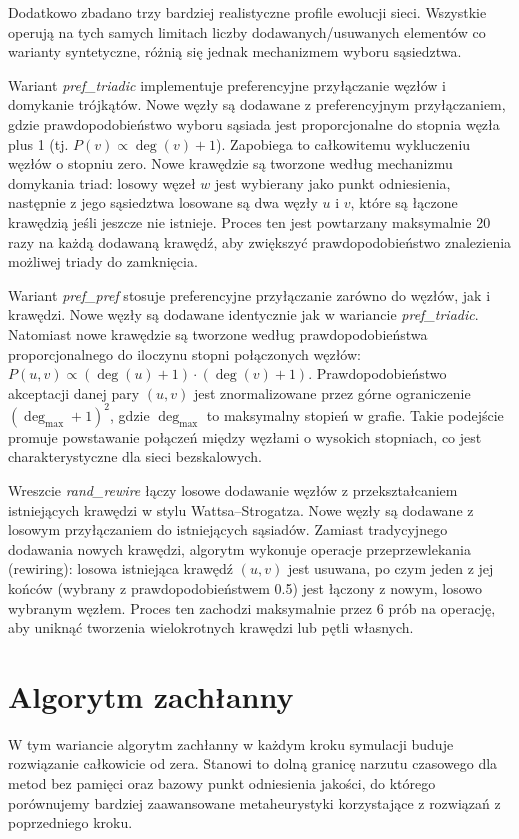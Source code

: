 Dodatkowo zbadano trzy bardziej realistyczne profile ewolucji sieci. Wszystkie operują na tych samych limitach liczby dodawanych/usuwanych elementów co warianty syntetyczne, różnią się jednak mechanizmem wyboru sąsiedztwa.

Wariant \emph{pref\_triadic} implementuje preferencyjne przyłączanie węzłów i domykanie trójkątów. Nowe węzły są dodawane z preferencyjnym przyłączaniem, gdzie prawdopodobieństwo wyboru sąsiada jest proporcjonalne do stopnia węzła plus 1 (tj. $P(v) \propto \deg(v) + 1$). Zapobiega to całkowitemu wykluczeniu węzłów o stopniu zero. Nowe krawędzie są tworzone według mechanizmu domykania triad: losowy węzeł $w$ jest wybierany jako punkt odniesienia, następnie z jego sąsiedztwa losowane są dwa węzły $u$ i $v$, które są łączone krawędzią jeśli jeszcze nie istnieje. Proces ten jest powtarzany maksymalnie 20 razy na każdą dodawaną krawędź, aby zwiększyć prawdopodobieństwo znalezienia możliwej triady do zamknięcia.

Wariant \emph{pref\_pref} stosuje preferencyjne przyłączanie zarówno do węzłów, jak i krawędzi. Nowe węzły są dodawane identycznie jak w wariancie \emph{pref\_triadic}. Natomiast nowe krawędzie są tworzone według prawdopodobieństwa proporcjonalnego do iloczynu stopni połączonych węzłów: $P(u,v) \propto (\deg(u)+1) \cdot (\deg(v)+1)$. Prawdopodobieństwo akceptacji danej pary $(u,v)$ jest znormalizowane przez górne ograniczenie $(\deg_{\max}+1)^2$, gdzie $\deg_{\max}$ to maksymalny stopień w grafie. Takie podejście promuje powstawanie połączeń między węzłami o wysokich stopniach, co jest charakterystyczne dla sieci bezskalowych.

Wreszcie \emph{rand\_rewire} łączy losowe dodawanie węzłów z przekształcaniem istniejących krawędzi w stylu Wattsa--Strogatza. Nowe węzły są dodawane z losowym przyłączaniem do istniejących sąsiadów. Zamiast tradycyjnego dodawania nowych krawędzi, algorytm wykonuje operacje przeprzewlekania (rewiring): losowa istniejąca krawędź $(u,v)$ jest usuwana, po czym jeden z jej końców (wybrany z prawdopodobieństwem 0.5) jest łączony z nowym, losowo wybranym węzłem. Proces ten zachodzi maksymalnie przez 6 prób na operację, aby uniknąć tworzenia wielokrotnych krawędzi lub pętli własnych.


\section{Algorytm zachłanny}

W tym wariancie algorytm zachłanny w każdym kroku symulacji buduje rozwiązanie całkowicie od zera. Stanowi to dolną granicę narzutu czasowego dla metod bez pamięci oraz bazowy punkt odniesienia jakości, do którego porównujemy bardziej zaawansowane metaheurystyki korzystające z rozwiązań z poprzedniego kroku.

